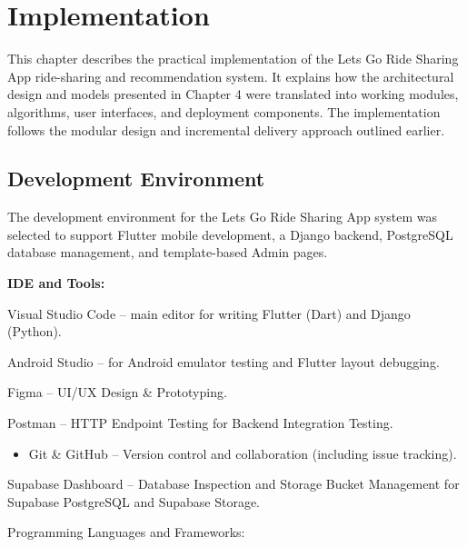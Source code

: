 
\chapter{Implementation}
\justifying

This chapter describes the practical implementation of the Lets Go Ride Sharing App ride-sharing and recommendation system. It explains how the architectural design and models presented in Chapter 4 were translated into working modules, algorithms, user interfaces, and deployment components. The implementation follows the modular design and incremental delivery approach outlined earlier.


\section{Development Environment}

The development environment for the Lets Go Ride Sharing App system was selected to support Flutter mobile development, a Django backend, PostgreSQL database management, and template-based Admin pages.

\textbf{IDE and Tools:}

Visual Studio Code – main editor for writing Flutter (Dart) and Django (Python).

Android Studio – for Android emulator testing and Flutter layout debugging.

Figma – UI/UX Design \& Prototyping.

Postman – HTTP Endpoint Testing for Backend Integration Testing.
\begin{itemize}
    \item Git \& GitHub – Version control and collaboration (including issue tracking).
\end{itemize}
Supabase Dashboard – Database Inspection and Storage Bucket Management for Supabase PostgreSQL and Supabase Storage.

Programming Languages and Frameworks:

